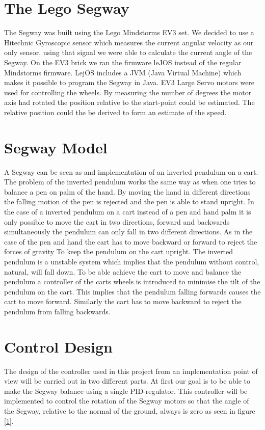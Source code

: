  \section{The Lego Segway}
 The Segway was built using the Lego Mindstorms EV3 set. We decided to use a Hitechnic Gyroscopic sensor which measures the current angular velocity as our only sensor, using that signal we were able to calculate the current angle of the Segway. On the EV3 brick we ran the firmware leJOS instead of the regular Mindstorms firmware. LejOS includes a JVM (Java Virtual Machine) which makes it possible to program the Segway in Java. EV3 Large Servo motors were used for controlling the wheels. By measuring the number of degrees the motor axis had rotated the position relative to the start-point could be estimated. The relative position could the be derived to form an estimate of the speed. 

\section{Segway Model}
A Segway can be seen as and implementation of an inverted pendulum on a cart. The problem of the inverted pendulum works the same way as when one tries to balance a pen on palm of the hand. By moving the hand in different directions the falling motion of the pen is rejected and the pen is able to stand upright. In the case of a inverted pendulum on a cart instead of a pen and hand palm it is only possible to move the cart in two directions, forward and backwards simultaneously the pendulum can only fall in two different directions. As in the case of the pen and hand the cart has to move backward or forward to reject the forces of gravity To keep the pendulum on the cart upright. The inverted pendulum is a unstable system which implies that the pendulum without control, natural, will fall down. To be able achieve the cart to move and balance the pendulum a controller of the carts wheels is introduced to minimise the tilt of the pendulum on the cart. This implies that the pendulum falling forwards causes the cart to move forward. Similarly the cart has to move backward to reject the pendulum from falling backwards. 


\section{Control Design}
The design of the controller used in this project from an implementation point of view will be carried out in two different parts. 
At first our goal is to be able to make the Segway balance using a single PID-regulator. This controller will be implemented to control the rotation of the Segway motors so that the angle of the Segway, relative to the normal of the ground, always is zero as seen in figure \ref{1}.

